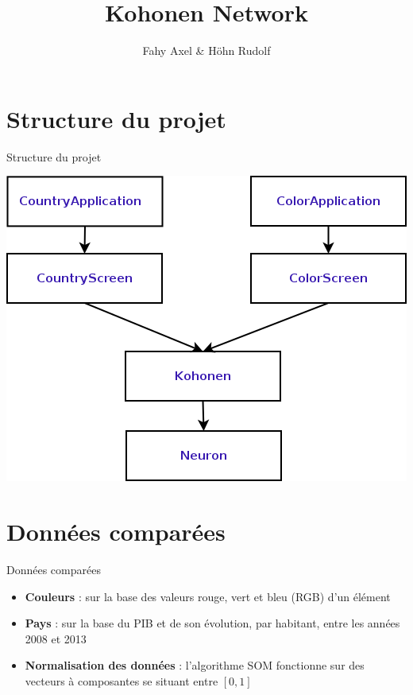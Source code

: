 \documentclass[11pt]{beamer}
\author{Fahy Axel \& Höhn Rudolf}
\title{Kohonen Network}
\institute{Algorithmes avancées\\hepia}
\begin{document}
\begin{frame}
\titlepage
\end{frame}

\begin{frame}
\tableofcontents
\end{frame}

\section{Structure du projet}
\begin{frame}{Structure du projet}
\begin{center}
\includegraphics[scale=0.5]{KohonenDiagram.png} 
\end{center}
\end{frame}

\section{Données comparées}
\begin{frame}{Données comparées}
\begin{itemize}
\item \textbf{Couleurs} : sur la base des valeurs rouge, vert et bleu (RGB) d'un élément
\item \textbf{Pays} : sur la base du PIB et de son évolution, par habitant, entre les années 2008 et 2013
\item \textbf{Normalisation des données} : l'algorithme SOM fonctionne sur des vecteurs à composantes se situant entre $[0, 1]$
\end{itemize}
\end{frame}
\end{document}
